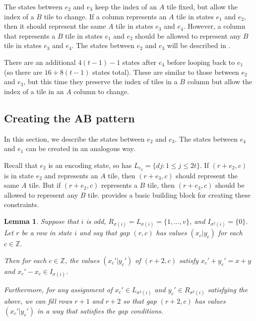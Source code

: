 \documentclass[11pt]{article}
\theoremstyle{plain}
\newtheorem{lemma}[theorem]{Lemma}
\theoremstyle{definition}
\begin{document}
The states between $e_2$ and $e_3$ keep the index of an $A$ tile fixed, but allow the index of a $B$ tile to change. If a column represents an $A$ tile in states $e_1$ and $e_2$, then it should represent the same $A$ tile in states $e_3$ and $e_4$. However, a column that represents a $B$ tile in states $e_1$ and $e_2$ should be allowed to represent any $B$ tile in states $e_3$ and $e_4$. The states between $e_2$ and $e_3$ will be described in .

There are an additional $4(t-1)-1$ states after $e_4$ before looping back to $e_1$ (so there are $16+8(t-1)$ states total). These are similar to those between $e_2$ and $e_3$, but this time they preserve the index of tiles in a $B$ column but allow the index of a tile in an $A$ column to change. 

\subsection{Creating the AB pattern}\label{sec:verticalconstraints}

In this section, we describe the states between $e_2$ and $e_3$. The states between $e_4$ and $e_1$ can be created in an analogous way.

Recall that $e_2$ is an encoding state, so has $L_{e_2}=\{dj:1\le j\le 2t\}$. If $(r+e_2, c)$ is in state $e_2$ and represents an $A$ tile, then $(r+e_3, c)$ should represent the same $A$ tile.
But if $(r+e_2, c)$ represents a $B$ tile, then $(r+e_3, c)$ should be allowed to represent any $B$ tile.
 provides a basic building block for creating these constraints.

\begin{lemma}\label{lem:verticalonlyconstraint}
Suppose that $i$ is odd, $R_{\sigma(i)}=L_{\sigma(i)}=\{1, \dots, v\}$, and $I_{\sigma^2(i)}=\{0\}$. Let $r$ be a row in state $i$ and say that gap $(r, c)$ has values $(x_c|y_c)$ for each $c\in \mathbb{Z}$.

Then for each $c\in \mathbb{Z}$, the values $(x_c'|y_c')$ of $(r+2, c)$ satisfy $x_c'+y_c'=x+y$ and $x_c'-x_c\in I_{\sigma(i)}$. 

Furthermore, for any assignment of $x_{c}'\in L_{\sigma^2(i)}$ and $y_{c}'\in R_{\sigma^2(i)}$ satisfying the above, we can fill rows $r+1$ and $r+2$ so that gap $(r+2, c)$ has values $(x_c'|y_c')$ in a way that satisfies the gap conditions.
\end{lemma}
\end{document}
